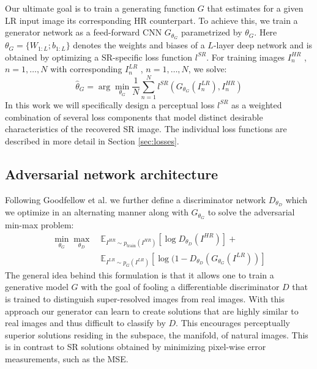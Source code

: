 \documentclass[10pt,twocolumn,letterpaper]{article}
\begin{document}
	Our ultimate goal is to train a generating function $G$ that estimates for a given \ac{LR} input image its corresponding \ac{HR} counterpart. To achieve this, we train a generator network as a feed-forward \ac{CNN} $G_{\theta_G}$ parametrized by ${\theta_G}$. Here ${\theta_G}=\{W_{1:L}; b_{1:L}\}$ denotes the weights and biases of a $L$-layer deep network and is obtained by optimizing a SR-specific loss function $l^{SR}$. For training images $I^{HR}_n$ , $n = 1,\dots,N$ with corresponding $I^{LR}_n$ , $n = 1,\dots,N$, we solve:
\begin{equation}
	\hat{{\theta}}_G = \arg\min_{\theta_G} \frac{1}{N} \sum_{n=1}^{N}{l^{SR}(G_{\theta_G}(I^{LR}_n),I^{HR}_n)}
\end{equation}
In this work we will specifically design a perceptual loss $l^{SR}$ as a weighted combination of several loss components that model distinct desirable characteristics of the recovered \ac{SR} image. The individual loss functions are described in more detail in Section \ref{sec:losses}.

\subsection{Adversarial network architecture}
Following Goodfellow et al. \cite{Goodfellow14GAN} we further define a discriminator network $D_{\theta_D}$ which we optimize in an alternating manner along with $G_{\theta_G}$ to solve the adversarial min-max problem: 
\begin{equation}
\label{eq:minmax}
\begin{split}
	\min_{\theta_G} \max_{\theta_D} ~& \mathbb{E}_{I^{HR}\sim p_\textrm{train}(I^{HR})} [ \log D_{\theta_D}(I^{HR}) ] + \\
	& \mathbb{E}_{I^{LR}\sim p_G(I^{LR})} [ \log (1-D_{\theta_D}(G_{\theta_G}(I^{LR})) ]
\end{split}
\end{equation}
The general idea behind this formulation is that it allows one to train a generative model $G$ with the goal of fooling a differentiable discriminator $D$ that is trained to distinguish super-resolved images from real images. 
With this approach our generator can learn to create solutions that are highly similar to real images and thus difficult to classify by $D$. This encourages perceptually superior solutions residing in the subspace, the manifold, of natural images. This is in contrast to \ac{SR} solutions obtained by minimizing pixel-wise error measurements, such as the \ac{MSE}.
\end{document}
